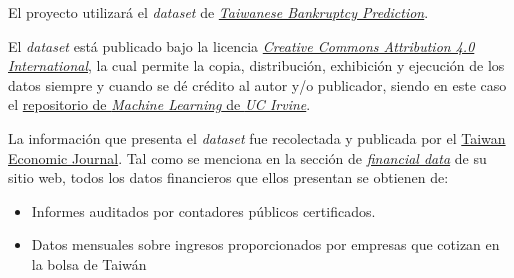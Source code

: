 \documentclass[
11pt, %
]{charter}
\begin{document}


El proyecto utilizará el \textit{dataset} de \href{https://archive.ics.uci.edu/dataset/572/taiwanese+bankruptcy+prediction}{\textit{Taiwanese Bankruptcy Prediction}}.

El \textit{dataset} está publicado bajo la licencia \href{https://creativecommons.org/licenses/by/4.0/legalcode}{\textit{Creative Commons Attribution 4.0 International}}, la cual permite la copia, distribución, exhibición y ejecución de los datos siempre y cuando se dé crédito al autor y/o publicador, siendo en este caso el \href{https://archive.ics.uci.edu/}{repositorio de \textit{Machine Learning} de \textit{UC Irvine}}.

La información que presenta el \textit{dataset} fue recolectada y publicada por el \href{https://www.tejwin.com/en/}{Taiwan Economic Journal}. Tal como se menciona en la sección de \href{https://www.tejwin.com/en/solution/financial-data/}{\textit{financial data}} de su sitio web, todos los datos financieros que ellos presentan se obtienen de:
\begin{itemize}
    \item Informes auditados por contadores públicos certificados.
    \item Datos mensuales sobre ingresos proporcionados por empresas que cotizan en la bolsa de Taiwán
\end{itemize}
\end{document}
